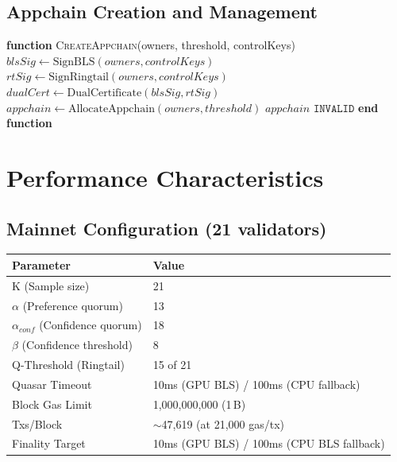 \documentclass[11pt]{article}
\begin{document}
\subsection{Appchain Creation and Management}



\begin{algorithmic}[1]
\State \textbf{function} \textsc{CreateAppchain}(owners, threshold, controlKeys)
    \State $blsSig \gets \text{SignBLS}(owners, controlKeys)$
    \State $rtSig \gets \text{SignRingtail}(owners, controlKeys)$
    \State $dualCert \gets \text{DualCertificate}(blsSig, rtSig)$
        \State $appchain \gets \text{AllocateAppchain}(owners, threshold)$
        \State \Return $appchain$
    \EndIf
    \State \Return $\texttt{INVALID}$
\State \textbf{end function}
\end{algorithmic}


\section{Performance Characteristics}

\subsection{Mainnet Configuration (21 validators)}

\begin{table}[h]
\centering
\begin{tabular}{@{}ll@{}}
\toprule
\textbf{Parameter} & \textbf{Value} \\
\midrule
K (Sample size) & 21 \\
$\alpha$ (Preference quorum) & 13 \\
$\alpha_{conf}$ (Confidence quorum) & 18 \\
$\beta$ (Confidence threshold) & 8 \\
Q-Threshold (Ringtail) & 15 of 21 \\
Quasar Timeout & 10ms (GPU BLS) / 100ms (CPU fallback) \\
Block Gas Limit & 1{,}000{,}000{,}000 (1\,B) \\
Txs/Block & $\sim$47{,}619 (at 21{,}000 gas/tx) \\
Finality Target & 10ms (GPU BLS) / 100ms (CPU BLS fallback) \\
\bottomrule
\end{tabular}

\label{tab:mainnet-params}
\end{table}
\end{document}
